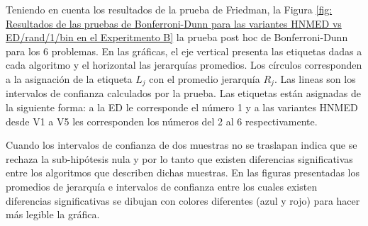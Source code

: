 Teniendo en cuenta los resultados de la prueba de Friedman, la Figura \ref{fig: Resultados de las pruebas de Bonferroni-Dunn para las variantes HNMED vs ED/rand/1/bin en el Experitmento B} la prueba post hoc de Bonferroni-Dunn para los 6 problemas. En las gráficas, el eje vertical presenta las etiquetas dadas a cada algoritmo y el horizontal las jerarquías promedios. Los círculos corresponden a la asignación de la etiqueta $L_j$ con el promedio jerarquía  $R_j$. Las lineas son los intervalos de confianza calculados por la prueba. Las etiquetas están asignadas de la siguiente forma: a la ED le corresponde el número 1 y a las variantes HNMED desde V1 a V5 les corresponden los números del 2 al 6 respectivamente.

Cuando los intervalos de confianza de dos muestras no se traslapan indica que se rechaza la sub-hipótesis nula y por lo tanto que existen diferencias significativas entre los algoritmos que describen dichas muestras. En las figuras presentadas los promedios de jerarquía e intervalos de confianza entre los cuales existen diferencias significativas se dibujan con colores diferentes (azul y rojo) para hacer más legible la gráfica.     

